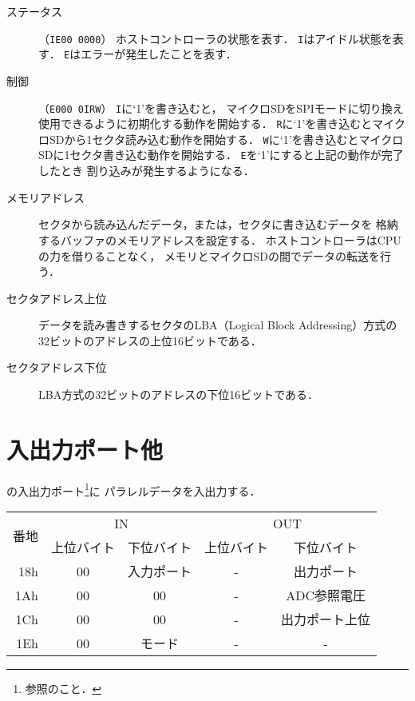 \begin{description}
\item[ステータス]（\texttt{IE00 0000}）
  ホストコントローラの状態を表す．
  \texttt{I}はアイドル状態を表す．
  \texttt{E}はエラーが発生したことを表す．
\item[制御]（\texttt{E000 0IRW}）
  \texttt{I}に`1'を書き込むと，
  マイクロSDをSPIモードに切り換え使用できるように初期化する動作を開始する．
  \texttt{R}に`1'を書き込むとマイクロSDから1セクタ読み込む動作を開始する．
  \texttt{W}に`1'を書き込むとマイクロSDに1セクタ書き込む動作を開始する．
  \texttt{E}を`1'にすると上記の動作が完了したとき
  割り込みが発生するようになる．
\item[メモリアドレス]
  セクタから読み込んだデータ，または，セクタに書き込むデータを
  格納するバッファのメモリアドレスを設定する．
  ホストコントローラはCPUの力を借りることなく，
  メモリとマイクロSDの間でデータの転送を行う．
\item[セクタアドレス上位]
  データを読み書きするセクタのLBA（Logical Block Addressing）方式の
  32ビットのアドレスの上位16ビットである．
\item[セクタアドレス下位]
  LBA方式の32ビットのアドレスの下位16ビットである．
\end{description}

\section{入出力ポート他}
{\tecS}の入出力ポート\footnote{参照のこと．}に
パラレルデータを入出力する．

\begin{center}
  \small\begin{tabular}{| r | c | c || c | c |}\hline
    \multirow{2}{*}{番地}
    & \multicolumn{2}{|c||}{IN}
    & \multicolumn{2}{c|}{OUT}
    \\\cline{2-5}
         & 上位バイト & 下位バイト & 上位バイト & 下位バイト
    \\\hline\hline
    18h  &  00 & 入力ポート
         &  -  & 出力ポート \\\hline
    1Ah  &  00 & 00
         &  -  & ADC参照電圧 \\\hline
    1Ch  &  00 & 00
         &  -  & 出力ポート上位 \\\hline
    1Eh  &  00 & モード
         &  - & - \\\hline
  \end{tabular}
\end{center}

